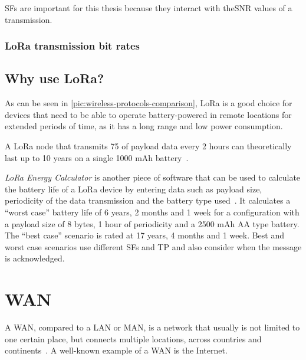 \aclp{SF} are important for this thesis because they interact with the\ac{SNR} values of a transmission.


\subsubsection{\ac{LoRa} transmission bit rates}


\subsection{Why use \acs{LoRa}?}

As can be seen in \cref{pic:wireless-protocols-comparison}, \ac{LoRa} is a good choice for devices that need to be able to operate battery-powered in remote locations for extended periods of time, as it has a long range and low power consumption.

A \ac{LoRa} node that transmits \SI{75}{\byte} of payload data every 2 hours can theoretically last up to 10 years on a single 1000 mAh battery~\cite{cheong_comparison_2017}.

\emph{LoRa Energy Calculator} is another piece of software that can be used to calculate the battery life of a \ac{LoRa} device by entering data such as payload size, periodicity of the data transmission and the battery type used~\cite{dramco_research_group_lora_2023}.
It calculates a ``worst case'' battery life of 6 years, 2 months and 1 week for a configuration with a payload size of 8 bytes, 1 hour of periodicity and a 2500 mAh AA type battery.
The ``best case'' scenario is rated at 17 years, 4 months and 1 week.
Best and worst case scenarios use different \aclp{SF} and \ac{TP} and also consider when the message is acknowledged.

\section{\acf{WAN}}

A \ac{WAN}, compared to a \acf{LAN} or \acf{MAN}, is a network that usually is not limited to one certain place, but connects multiple locations, across countries and continents~\cite[p. 2]{sadiku_fundamentals_2022}.
A well-known example of a \ac{WAN} is the Internet.

